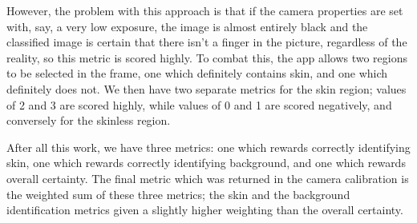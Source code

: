 However, the problem with this approach is that if the camera properties are set with, say, a very low exposure, the image is almost entirely black and the classified image is certain that there isn't a finger in the picture, regardless of the reality, so this metric is scored highly. To combat this, the app allows two regions to be selected in the frame, one which definitely contains skin, and one which definitely does not. We then have two separate metrics for the skin region; values of 2 and 3 are scored highly, while values of 0 and 1 are scored negatively, and conversely for the skinless region.

After all this work, we have three metrics: one which rewards correctly identifying skin, one which rewards correctly identifying background, and one which rewards overall certainty. The final metric which was returned in the camera calibration is the weighted sum of these three metrics; the skin and the background identification metrics given a slightly higher weighting than the overall certainty.

\clearpage


